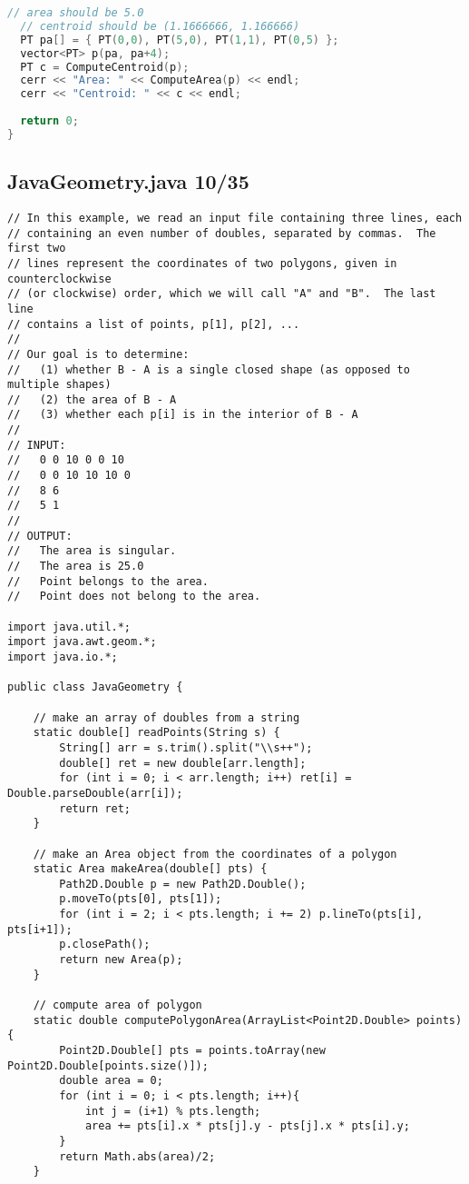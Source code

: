 \begin{lstlisting}[language=C++]
  // area should be 5.0
  // centroid should be (1.1666666, 1.166666)
  PT pa[] = { PT(0,0), PT(5,0), PT(1,1), PT(0,5) };
  vector<PT> p(pa, pa+4);
  PT c = ComputeCentroid(p);
  cerr << "Area: " << ComputeArea(p) << endl;
  cerr << "Centroid: " << c << endl;
  
  return 0;
}
\end{lstlisting}
\subsection{JavaGeometry.java 10/35}
\begin{lstlisting}
// In this example, we read an input file containing three lines, each
// containing an even number of doubles, separated by commas.  The first two
// lines represent the coordinates of two polygons, given in counterclockwise 
// (or clockwise) order, which we will call "A" and "B".  The last line 
// contains a list of points, p[1], p[2], ...
//
// Our goal is to determine:
//   (1) whether B - A is a single closed shape (as opposed to multiple shapes)
//   (2) the area of B - A
//   (3) whether each p[i] is in the interior of B - A
//
// INPUT:
//   0 0 10 0 0 10
//   0 0 10 10 10 0
//   8 6
//   5 1
//
// OUTPUT:
//   The area is singular.
//   The area is 25.0
//   Point belongs to the area.
//   Point does not belong to the area.

import java.util.*;
import java.awt.geom.*;
import java.io.*;

public class JavaGeometry {

    // make an array of doubles from a string
    static double[] readPoints(String s) {
        String[] arr = s.trim().split("\\s++");
        double[] ret = new double[arr.length];
        for (int i = 0; i < arr.length; i++) ret[i] = Double.parseDouble(arr[i]);
        return ret;
    }

    // make an Area object from the coordinates of a polygon
    static Area makeArea(double[] pts) {
        Path2D.Double p = new Path2D.Double();
        p.moveTo(pts[0], pts[1]);
        for (int i = 2; i < pts.length; i += 2) p.lineTo(pts[i], pts[i+1]);
        p.closePath();
        return new Area(p);        
    }

    // compute area of polygon
    static double computePolygonArea(ArrayList<Point2D.Double> points) {
        Point2D.Double[] pts = points.toArray(new Point2D.Double[points.size()]);  
        double area = 0;
        for (int i = 0; i < pts.length; i++){
            int j = (i+1) % pts.length;
            area += pts[i].x * pts[j].y - pts[j].x * pts[i].y;
        }        
        return Math.abs(area)/2;
    }


\end{lstlisting}
